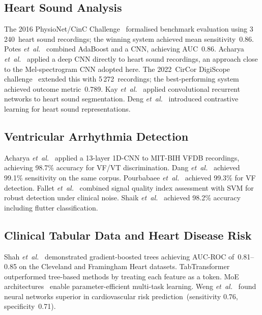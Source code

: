 \documentclass[AMA,STIX1COL,]{WileyNJD-v2}
\begin{document}
\subsection{Heart Sound Analysis}

The 2016 PhysioNet/CinC Challenge~\cite{clifford2016} formalised
benchmark evaluation using 3\,240~heart sound recordings; the winning
system achieved mean sensitivity~0.86. Potes \emph{et~al.}~\cite{potes2016}
combined AdaBoost and a CNN, achieving AUC~0.86. Acharya
\emph{et~al.}~\cite{acharya2017} applied a deep CNN directly to heart
sound recordings, an approach close to the Mel-spectrogram CNN adopted
here. The 2022~CirCor
DigiScope challenge~\cite{oliveira2022} extended this with
5\,272~recordings; the best-performing system achieved outcome
metric~0.789. Kay \emph{et~al.}~\cite{kay2020} applied convolutional
recurrent networks to heart sound segmentation. Deng
\emph{et~al.}~\cite{deng2020} introduced contrastive learning for
heart sound representations.

\subsection{Ventricular Arrhythmia Detection}

Acharya \emph{et~al.}~\cite{acharya2018} applied a 13-layer 1D-CNN
to MIT-BIH VFDB recordings, achieving 98.7\% accuracy for VF/VT
discrimination. Dang \emph{et~al.}~\cite{dang2019} achieved 99.1\%
sensitivity on the same corpus. Pourbabaee
\emph{et~al.}~\cite{pourbabaee2018} achieved 99.3\% for VF detection.
Fallet \emph{et~al.}~\cite{fallet2015} combined signal quality index
assessment with SVM for robust detection under clinical noise. Shaik
\emph{et~al.}~\cite{shaik2021} achieved 98.2\% accuracy including
flutter classification.

\subsection{Clinical Tabular Data and Heart Disease Risk}

Shah \emph{et~al.}~\cite{shah2020} demonstrated gradient-boosted trees
achieving AUC-ROC of~0.81--0.85 on the Cleveland and Framingham Heart
datasets. TabTransformer~\cite{huang2020} outperformed tree-based
methods by treating each feature as a token. MoE
architectures~\cite{shazeer2017} enable parameter-efficient multi-task
learning. Weng \emph{et~al.}~\cite{weng2017} found neural networks
superior in cardiovascular risk prediction~(sensitivity 0.76,
specificity~0.71).
\end{document}
